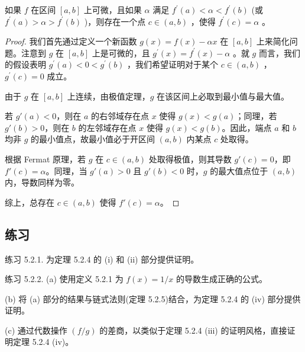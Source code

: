 \begin{Thm}[Darboux定理]
  \label{thm:5.2.7}
  如果 \(f\) 在区间 \(\left\lbrack  {a,b}\right\rbrack\) 上可微，且如果 \(\alpha\) 满足 \({f}^{\prime }\left( a\right)  < \alpha  < {f}^{\prime }\left( b\right)\) (或 \({f}^{\prime }\left( a\right)  > \alpha  > {f}^{\prime }\left( b\right)\) )，则存在一个点 \(c \in  \left( {a,b}\right)\) ，使得 \({f}^{\prime }\left( c\right)  = \alpha\) 。
\end{Thm}

\begin{proof}
  我们首先通过定义一个新函数 \(g\left( x\right)  = f\left( x\right)  - {\alpha x}\) 在 \(\left\lbrack  {a,b}\right\rbrack\) 上来简化问题。注意到 \(g\) 在 \(\left\lbrack  {a,b}\right\rbrack\) 上是可微的，且 \({g}^{\prime }\left( x\right)  = {f}^{\prime }\left( x\right)  - \alpha\) 。就 \(g\) 而言，我们的假设表明 \({g}^{\prime }\left( a\right)  < 0 < {g}^{\prime }\left( b\right)\) ，我们希望证明对于某个 \(c \in  \left( {a,b}\right)\) ， \({g}^{\prime }\left( c\right)  = 0\) 成立。

  由于 \(g\) 在 $[a,b]$ 上连续，由极值定理，$g$ 在该区间上必取到最小值与最大值。

  若 \(g'(a) < 0\)，则在 \(a\) 的右邻域存在点 \(x\) 使得 \(g(x) < g(a)\)；同理，若 \(g'(b) > 0\)，则在 \(b\) 的左邻域存在点 \(x\) 使得 \(g(x) < g(b)\)。因此，端点 \(a\) 和 \(b\) 均非 \(g\) 的最小值点，故最小值必于开区间 \((a,b)\) 内某点 \(c\) 处取得。

  根据 Fermat 原理，若 \(g\) 在 \(c \in (a,b)\) 处取得极值，则其导数 \(g'(c) = 0\)，即 \(f'(c) = \alpha\)。同理，当 \(g'(a) > 0\) 且 \(g'(b) < 0\) 时，\(g\) 的最大值点位于 \((a,b)\) 内，导数同样为零。

  综上，总存在 \(c \in (a,b)\) 使得 \(f'(c) = \alpha\)。
\end{proof}


\subsection{练习}

练习 5.2.1. 为定理 5.2.4 的 (i) 和 (ii) 部分提供证明。

练习 5.2.2. (a) 使用定义 5.2.1 为 \(f\left( x\right)  = 1/x\) 的导数生成正确的公式。

(b) 将 (a) 部分的结果与链式法则(定理 5.2.5)结合，为定理 5.2.4 的 (iv) 部分提供证明。

(c) 通过代数操作 \(\left( {f/g}\right)\) 的差商，以类似于定理 5.2.4 (iii) 的证明风格，直接证明定理 5.2.4 (iv)。


